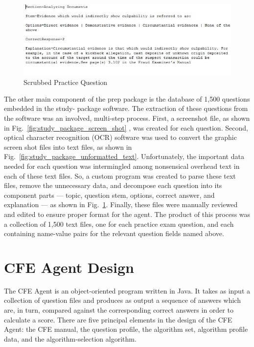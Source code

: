 \begin{figure}
\centering
\vspace{2.0in}
\includegraphics[scale=0.75]{study_package_formatted_text.jpg}
\caption{Scrubbed Practice Question}
\label{fig:study_package_formatted_text}
\end{figure}

The other main component of the prep package is the database of 1,500 questions embedded in the study- package software.  The extraction of these questions from the software was an involved, multi-step process.  First, a screenshot file, as shown in Fig.~\ref{fig:study_package_screen_shot} \cite{acfe_study_package_2011},  was created for each question.  Second, optical character recognition (OCR) software was used to convert the graphic screen shot files into text files, as shown in Fig.~\ref{fig:study_package_unformatted_text}.  Unfortunately, the important data needed for each question was intermingled among nonsensical overhead text in each of these text files.  So, a custom program was created to parse these text files, remove the unnecessary data, and decompose each question into its component parts --- topic, question stem, options, correct answer, and explanation --- as shown in Fig.~\ref{fig:study_package_formatted_text}.  Finally, these files were manually reviewed and edited to ensure proper format for the agent.  The product of this process was a collection of 1,500 text files, one for each practice exam question, and each containing name-value pairs for the relevant question fields named above.




\section{CFE Agent Design}

The CFE Agent is an object-oriented program written in Java.  It takes as input a collection of question files and produces as output a sequence of answers which are, in turn, compared against the corresponding correct answers in order to calculate a score.  There are five principal elements in the design of the CFE Agent: the CFE manual, the question profile, the algorithm set, algorithm profile data, and the algorithm-selection algorithm.

